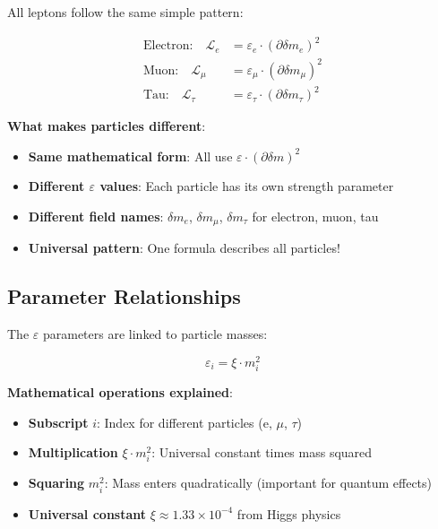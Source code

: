 \documentclass[12pt,a4paper]{article}
\newcommand{\deltam}{\delta m}
\newcommand{\Lag}{\mathcal{L}}
\newcommand{\xipar}{\xi}
\theoremstyle{definition}
\theoremstyle{remark}
\begin{document}
	All leptons follow the same simple pattern:
	
	\begin{align}
		\text{Electron:} \quad \Lag_e &= \varepsilon_e \cdot (\partial \deltam_e)^2 \\
		\text{Muon:} \quad \Lag_{\mu} &= \varepsilon_{\mu} \cdot (\partial \deltam_{\mu})^2 \\
		\text{Tau:} \quad \Lag_{\tau} &= \varepsilon_{\tau} \cdot (\partial \deltam_{\tau})^2
	\end{align}
	
	\textbf{What makes particles different}:
	\begin{itemize}
		\item \textbf{Same mathematical form}: All use $\varepsilon \cdot (\partial \deltam)^2$
		\item \textbf{Different $\varepsilon$ values}: Each particle has its own strength parameter
		\item \textbf{Different field names}: $\deltam_e$, $\deltam_{\mu}$, $\deltam_{\tau}$ for electron, muon, tau
		\item \textbf{Universal pattern}: One formula describes all particles!
	\end{itemize}
	
	\subsection{Parameter Relationships}
	
	The $\varepsilon$ parameters are linked to particle masses:
	
	\begin{equation}
		\varepsilon_i = \xipar \cdot m_i^2
		\label{eq:epsilon_mass_relation}
	\end{equation}
	
	\textbf{Mathematical operations explained}:
	\begin{itemize}
		\item \textbf{Subscript} $i$: Index for different particles (e, $\mu$, $\tau$)
		\item \textbf{Multiplication} $\xipar \cdot m_i^2$: Universal constant times mass squared
		\item \textbf{Squaring} $m_i^2$: Mass enters quadratically (important for quantum effects)
		\item \textbf{Universal constant} $\xipar \approx 1.33 \times 10^{-4}$ from Higgs physics
	\end{itemize}
	
\end{document}

